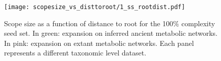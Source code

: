 \begin{figure}[H]
    \centering
    \texttt{[image: scopesize\_vs\_disttoroot/1\_ss\_rootdist.pdf]}
    \caption{Scope size as a function of distance to root for the 100\% complexity seed set. In green: expansion on inferred ancient metabolic networks. In pink: expansion on extant metabolic networks. Each panel represents a different taxonomic level dataset.}
    \label{1_scopesize}
\end{figure}   














